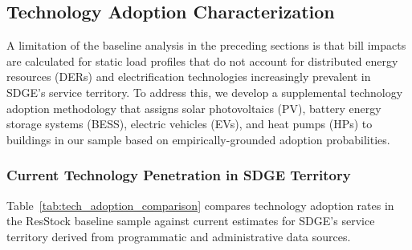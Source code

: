 %

\subsection{Technology Adoption Characterization}
\label{sec:tech_adoption}

A limitation of the baseline analysis in the preceding sections is that bill impacts are calculated for static load profiles that do not account for distributed energy resources (DERs) and electrification technologies increasingly prevalent in SDGE's service territory. To address this, we develop a supplemental technology adoption methodology that assigns solar photovoltaics (PV), battery energy storage systems (BESS), electric vehicles (EVs), and heat pumps (HPs) to buildings in our sample based on empirically-grounded adoption probabilities.

\subsubsection{Current Technology Penetration in SDGE Territory}
\label{sec:actual_adoption}

Table~\ref{tab:tech_adoption_comparison} compares technology adoption rates in the ResStock baseline sample against current estimates for SDGE's service territory derived from programmatic and administrative data sources.

